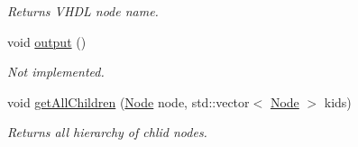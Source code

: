 \begin{DoxyCompactItemize}
\begin{DoxyCompactList}\small\item\em Returns VHDL node name. \item\end{DoxyCompactList}\item 
void \hyperlink{classxhal_1_1utils_1_1Node_a2ef158a6071fd2d560ebd09e606cd7b0}{output} ()
\begin{DoxyCompactList}\small\item\em Not implemented. \item\end{DoxyCompactList}\item 
void \hyperlink{classxhal_1_1utils_1_1Node_adf91d1e49a26d7d78880ee8c076b8de5}{getAllChildren} (\hyperlink{classxhal_1_1utils_1_1Node}{Node} node, std::vector$<$ \hyperlink{classxhal_1_1utils_1_1Node}{Node} $>$ kids)
\begin{DoxyCompactList}\small\item\em Returns all hierarchy of chlid nodes. \item\end{DoxyCompactList}\end{DoxyCompactItemize}
